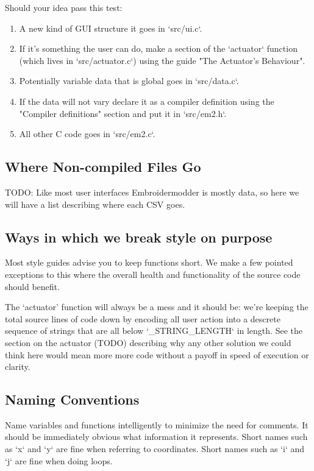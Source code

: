 \documentclass{report}
\begin{document}
Should your idea pass this test:

\begin{enumerate}
\item A new kind of GUI structure it goes in `src/ui.c`.
\item If it's something the user can do, make a section of the `actuator` function (which lives in `src/actuator.c`) using the guide "The Actuator's Behaviour".
\item Potentially variable data that is global goes in `src/data.c`.
\item If the data will not vary declare it as a compiler definition using the "Compiler definitions" section and put it in `src/em2.h`.
\item All other C code goes in `src/em2.c`.
\end{enumerate}

\subsection{Where Non-compiled Files Go}

TODO: Like most user interfaces Embroidermodder is mostly data, so here we will have a list describing where each CSV goes.

\subsection{Ways in which we break style on purpose}

Most style guides advise you to keep functions short. We make a few pointed exceptions to this where the overall health and functionality of the source code should benefit.

The `actuator' function will always be a mess
and it should be: we're keeping the total source
lines of code down by encoding all user action into
a descrete sequence of strings that are all below
`\_STRING\_LENGTH` in length. See the section on
the actuator (TODO) describing why any other solution
we could think  here would mean more more code without
a payoff in speed of execution or clarity.

\subsection{Naming Conventions}

Name variables and functions intelligently to minimize the need for comments.
It should be immediately obvious what information it represents.
Short names such as `x` and `y` are fine when referring to coordinates.
Short names such as `i` and `j` are fine when doing loops.
\end{document}
